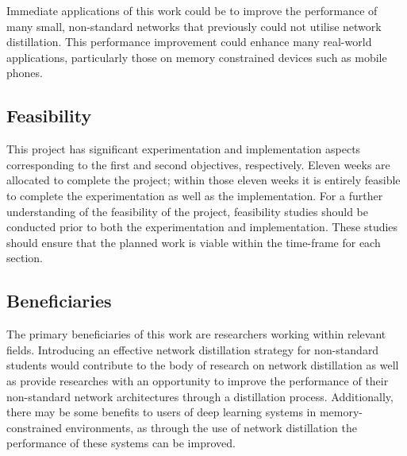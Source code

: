 \documentclass[a4paper,11pt]{article}
\begin{document}
Immediate applications of this work could be to improve the performance of many small, non-standard networks that previously could not utilise network distillation. This performance improvement could enhance many real-world applications, particularly those on memory constrained devices such as mobile phones.


\subsection{Feasibility}
This project has significant experimentation and implementation aspects corresponding to the first and second objectives, respectively. Eleven weeks are allocated to complete the project; within those eleven weeks it is entirely feasible to complete the experimentation as well as the implementation. For a further understanding of the feasibility of the project, feasibility studies should be conducted prior to both the experimentation and implementation. These studies should ensure that the planned work is viable within the time-frame for each section. 

\subsection{Beneficiaries}
The primary beneficiaries of this work are researchers working within relevant fields. Introducing an effective network distillation strategy for non-standard students would contribute to the body of research on network distillation as well as provide researches with an opportunity to improve the performance of their non-standard network architectures through a distillation process. Additionally, there may be some benefits to users of deep learning systems in memory-constrained environments, as through the use of network distillation the performance of these systems can be improved.
\end{document}
